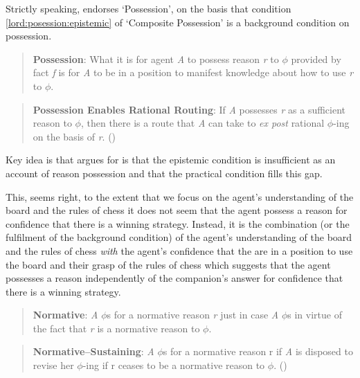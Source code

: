 \documentclass[10pt]{article}
\begin{document}
Strictly speaking, \citeauthor{Lord:2018aa} endorses `Possession', on the basis that condition \ref{lord:posession:epistemic} of `Composite Possession' is a background condition on possession.

\begin{quote}
  \textbf{Possession}: What it is for agent \emph{A} to possess reason \emph{r} to \(\phi\) provided by fact \emph{f} is for \emph{A} to be in a position to manifest knowledge about how to use \emph{r} to \(\phi\).
\end{quote}

\begin{quote}
  \textbf{Possession Enables Rational Routing}: If \emph{A} possesses \emph{r} as a sufficient reason to \(\phi\), then there is a route that \emph{A} can take to \emph{ex post} rational \(\phi\)-ing on the basis of \emph{r}.\nolinebreak
  \mbox{}\hfill\mbox{(\citeyear[100]{Lord:2018aa})}
\end{quote}

Key idea is that \citeauthor{Lord:2018aa} argues for is that the epistemic condition is insufficient as an account of reason possession and that the practical condition fills this gap.

This, seems right, to the extent that we focus on the agent's understanding of the board and the rules of chess it does not seem that the agent possess a reason for confidence that there is a winning strategy.
Instead, it is the combination (or the fulfilment of the background condition) of the agent's understanding of the board and the rules of chess \emph{with} the agent's confidence that the are in a position to use the board and their grasp of the rules of chess which suggests that the agent possesses a reason independently of the companion's answer for confidence that there is a winning strategy.

\begin{quote}
  \textbf{Normative}: \emph{A} \(\phi\)s for a normative reason \emph{r} just in case \emph{A} \(\phi\)s in virtue of the fact that \emph{r} is a normative reason to \(\phi\).
\end{quote}

\begin{quote}
  \textbf{Normative–Sustaining}: \emph{A} \(\phi\)s for a normative reason r if \emph{A} is disposed to revise her \(\phi\)-ing if r ceases to be a normative reason to \(\phi\).\nolinebreak
  \mbox{}\hfill\mbox{(\citeyear[138]{Lord:2018aa})}
\end{quote}
\end{document}
